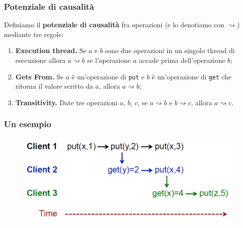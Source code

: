 \begin{frame}
\frametitle{Potenziale di causalità}
	\begin{definizione}
	Definiamo il \textbf{potenziale di causalità} fra operazioni (e lo denotiamo con $\rightsquigarrow$)
	mediante tre regole:
	\begin{enumerate}
		\item<1-> \textbf{Execution thread.}
				  Se $a$ e $b$ sono due operazioni in un singolo thread di esecuzione
				  allora $a \rightsquigarrow b$ se l'operazione $a$ accade prima dell'operazione $b$;
		\item<1-> \textbf{Gets From.}
				  Se $a$ è un'operazione di \texttt{put} e $b$ è un'operazione di
				  \texttt{get} che ritorna il valore scritto da $a$, allora $a \rightsquigarrow b$;
		\item<1-> \textbf{Transitivity.}
				  Date tre operazioni $a$, $b$, $c$, se $a \rightsquigarrow b$ e $b 
				  \rightsquigarrow c$, allora $a \rightsquigarrow c$.
	\end{enumerate}
	\end{definizione}
\end{frame}

\begin{frame}
\frametitle{Un esempio}
	\begin{figure}
		\centering
		\includegraphics[scale=0.40]{COPS/COPS2.png}
	\end{figure}
\end{frame}

